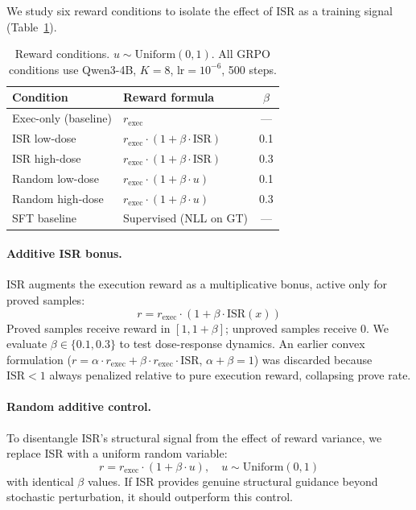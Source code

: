 We study six reward conditions to isolate the effect of ISR as a training signal (Table~\ref{tab:reward}).

\begin{table}[t]
\centering
\small
\begin{tabular}{@{}llc@{}}
\toprule
\textbf{Condition} & \textbf{Reward formula} & $\beta$ \\
\midrule
Exec-only (baseline) & $r_{\text{exec}}$ & --- \\
ISR low-dose & $r_{\text{exec}} \cdot (1 + \beta \cdot \text{ISR})$ & 0.1 \\
ISR high-dose & $r_{\text{exec}} \cdot (1 + \beta \cdot \text{ISR})$ & 0.3 \\
Random low-dose & $r_{\text{exec}} \cdot (1 + \beta \cdot u)$ & 0.1 \\
Random high-dose & $r_{\text{exec}} \cdot (1 + \beta \cdot u)$ & 0.3 \\
SFT baseline & Supervised (NLL on GT) & --- \\
\bottomrule
\end{tabular}
\caption{Reward conditions. $u \sim \text{Uniform}(0,1)$. All GRPO conditions use Qwen3-4B, $K{=}8$, lr$=10^{-6}$, 500 steps.}
\label{tab:reward}
\end{table}

\paragraph{Additive ISR bonus.}
ISR augments the execution reward as a multiplicative bonus, active only for proved samples:
\begin{equation}
  r = r_{\text{exec}} \cdot (1 + \beta \cdot \text{ISR}(x))
  \label{eq:additive_isr}
\end{equation}
Proved samples receive reward in $[1, 1{+}\beta]$; unproved samples receive $0$.
We evaluate $\beta \in \{0.1, 0.3\}$ to test dose-response dynamics.
An earlier convex formulation ($r = \alpha \cdot r_{\text{exec}} + \beta \cdot r_{\text{exec}} \cdot \text{ISR}$, $\alpha{+}\beta{=}1$) was discarded because $\text{ISR} < 1$ always penalized relative to pure execution reward, collapsing prove rate.

\paragraph{Random additive control.}
To disentangle ISR's structural signal from the effect of reward variance, we replace ISR with a uniform random variable:
\begin{equation}
  r = r_{\text{exec}} \cdot (1 + \beta \cdot u), \quad u \sim \text{Uniform}(0, 1)
  \label{eq:additive_random}
\end{equation}
with identical $\beta$ values.
If ISR provides genuine structural guidance beyond stochastic perturbation, it should outperform this control.

